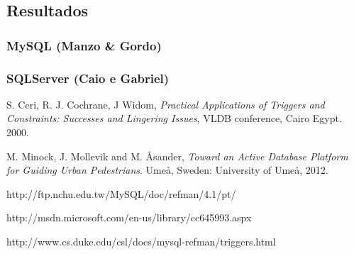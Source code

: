 \documentclass[conference]{IEEEtran}
\begin{document}
  \subsection{Resultados}
    \subsubsection{MySQL (Manzo \& Gordo)}
    \subsubsection{SQLServer (Caio e Gabriel)}

\begin{thebibliography}{1}

  S. Ceri, R. J. Cochrane, J Widom, \textit{Practical Applications of Triggers and Constraints: Successes and Lingering Issues}, VLDB conference, Cairo Egypt. 2000.

  M. Minock, J. Mollevik and M. \r{A}sander, \textit{Toward an Active Database Platform for Guiding Urban Pedestrians}. Ume\r{a}, Sweden: University of Ume\r{a}, 2012.

  http://ftp.nchu.edu.tw/MySQL/doc/refman/4.1/pt/

  http://msdn.microsoft.com/en-us/library/cc645993.aspx

  http://www.cs.duke.edu/csl/docs/mysql-refman/triggers.html
\end{thebibliography}
\end{document}
